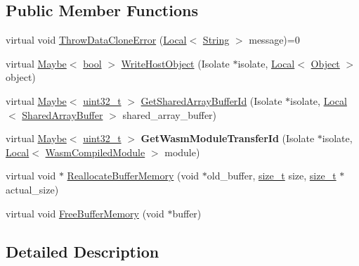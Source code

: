 \subsection*{Public Member Functions}
\begin{DoxyCompactItemize}
\item 
virtual void \mbox{\hyperlink{classv8_1_1ValueSerializer_1_1Delegate_a3681bfcd9a6c45f0b12bd7a8bdf34d85}{Throw\+Data\+Clone\+Error}} (\mbox{\hyperlink{classv8_1_1Local}{Local}}$<$ \mbox{\hyperlink{classv8_1_1String}{String}} $>$ message)=0
\item 
virtual \mbox{\hyperlink{classv8_1_1Maybe}{Maybe}}$<$ \mbox{\hyperlink{classbool}{bool}} $>$ \mbox{\hyperlink{classv8_1_1ValueSerializer_1_1Delegate_a9cdf9bb45300507456548161cbe656b5}{Write\+Host\+Object}} (Isolate $\ast$isolate, \mbox{\hyperlink{classv8_1_1Local}{Local}}$<$ \mbox{\hyperlink{classv8_1_1Object}{Object}} $>$ object)
\item 
virtual \mbox{\hyperlink{classv8_1_1Maybe}{Maybe}}$<$ \mbox{\hyperlink{classuint32__t}{uint32\+\_\+t}} $>$ \mbox{\hyperlink{classv8_1_1ValueSerializer_1_1Delegate_ac12b5cfd7480c19f0b9af0b47d05a77e}{Get\+Shared\+Array\+Buffer\+Id}} (Isolate $\ast$isolate, \mbox{\hyperlink{classv8_1_1Local}{Local}}$<$ \mbox{\hyperlink{classv8_1_1SharedArrayBuffer}{Shared\+Array\+Buffer}} $>$ shared\+\_\+array\+\_\+buffer)
\item 
\mbox{\label{classv8_1_1ValueSerializer_1_1Delegate_a148282d2c8de6413c47bef4b62bc487b}} 
virtual \mbox{\hyperlink{classv8_1_1Maybe}{Maybe}}$<$ \mbox{\hyperlink{classuint32__t}{uint32\+\_\+t}} $>$ {\bfseries Get\+Wasm\+Module\+Transfer\+Id} (Isolate $\ast$isolate, \mbox{\hyperlink{classv8_1_1Local}{Local}}$<$ \mbox{\hyperlink{classv8_1_1WasmCompiledModule}{Wasm\+Compiled\+Module}} $>$ module)
\item 
virtual void $\ast$ \mbox{\hyperlink{classv8_1_1ValueSerializer_1_1Delegate_ade3ce68ebf5a3f3eba2f8f091177f155}{Reallocate\+Buffer\+Memory}} (void $\ast$old\+\_\+buffer, \mbox{\hyperlink{classsize__t}{size\+\_\+t}} size, \mbox{\hyperlink{classsize__t}{size\+\_\+t}} $\ast$actual\+\_\+size)
\item 
virtual void \mbox{\hyperlink{classv8_1_1ValueSerializer_1_1Delegate_a9cd4ab0061b4a26b4b0d695d31992f82}{Free\+Buffer\+Memory}} (void $\ast$buffer)
\end{DoxyCompactItemize}


\subsection{Detailed Description}


